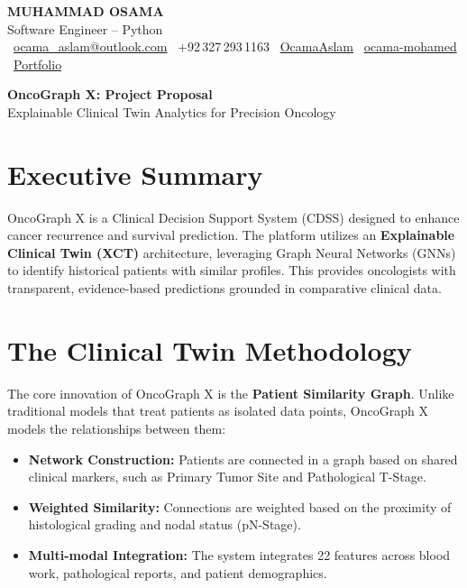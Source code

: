 \documentclass[11pt]{article}
\begin{document}
\begin{center}
    {\LARGE\bfseries\color{heading} MUHAMMAD OSAMA}\\[3pt]
    {\normalsize\color{accent}Software Engineer -- Python}\\[4pt]
    \small
    \faEnvelope\ \href{mailto:ocama_aslam@outlook.com}{ocama\_aslam@outlook.com} \quad
    \faPhone\ +92\,327\,293\,1163 \quad
    \faGithub\ \href{https://github.com/OcamaAslam}{OcamaAslam} \quad
    \faLinkedin\ \href{https://linkedin.com/in/ocama-mohamed}{ocama-mohamed} \quad
    \faGlobe\ \href{https://www.artfolio.tech/osama}{Portfolio}
\end{center}

\vspace{1em}
\begin{center}
    {\huge\bfseries\color{heading} OncoGraph X: Project Proposal} \\
    {\large\color{accent} Explainable Clinical Twin Analytics for Precision Oncology}
\end{center}
\vspace{1.5em}

\section{Executive Summary}
OncoGraph X is a Clinical Decision Support System (CDSS) designed to enhance cancer recurrence and survival prediction. The platform utilizes an \textbf{Explainable Clinical Twin (XCT)} architecture, leveraging Graph Neural Networks (GNNs) to identify historical patients with similar profiles. This provides oncologists with transparent, evidence-based predictions grounded in comparative clinical data.

\section{The Clinical Twin Methodology}
The core innovation of OncoGraph X is the \textbf{Patient Similarity Graph}. Unlike traditional models that treat patients as isolated data points, OncoGraph X models the relationships between them:
\begin{itemize}[noitemsep]
    \item \textbf{Network Construction:} Patients are connected in a graph based on shared clinical markers, such as Primary Tumor Site and Pathological T-Stage.
    \item \textbf{Weighted Similarity:} Connections are weighted based on the proximity of histological grading and nodal status (pN-Stage).
    \item \textbf{Multi-modal Integration:} The system integrates 22 features across blood work, pathological reports, and patient demographics.
\end{itemize}
\end{document}
